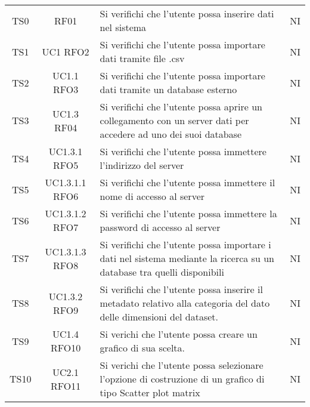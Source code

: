 \documentclass[../piano_di_qualifica.tex]{subfiles}
\begin{document}
\begin{center}
\begin{longtable}{|c|c|p{8cm}|c|}
		\endlastfoot
		TS0               & RF01                   & Si verifichi che l'utente possa inserire dati nel sistema                                                              & NI                         \\
		TS1               & UC1 RFO2               & Si verifichi che l'utente possa importare dati tramite file .csv                                                       & NI                         \\
		TS2               & UC1.1 RFO3             & Si verifichi che l'utente possa importare dati tramite un database esterno                                             & NI                         \\
		TS3               & UC1.3 RF04             & Si verifichi che l'utente possa aprire un collegamento con un server dati per accedere ad uno dei suoi database        & NI                         \\
		TS4               & UC1.3.1 RFO5           & Si verifichi che l’utente possa immettere l’indirizzo del server                                                       & NI                         \\
		TS5               & UC1.3.1.1 RFO6         & Si verifichi che l’utente possa immettere il nome di accesso al server                                                 & NI                         \\
		TS6               & UC1.3.1.2 RFO7         & Si verifichi che l’utente possa immettere la password di accesso al server                                             & NI                         \\
		TS7               & UC1.3.1.3 RFO8         & Si verifichi che l’utente possa importare i dati nel sistema mediante la ricerca su un database tra quelli disponibili & NI                         \\
		TS8               & UC1.3.2 RFO9           & Si verifichi che l’utente possa inserire il metadato relativo alla categoria del dato delle dimensioni del dataset.    & NI                         \\
		TS9               & UC1.4 RFO10            & Si verichi che l'utente possa creare un grafico di sua scelta.                                                         & NI                         \\
		TS10              & UC2.1 RFO11            & Si verichi che l'utente possa  selezionare l’opzione di costruzione di un grafico di tipo Scatter plot matrix          & NI                         \\

\end{longtable}
\end{center}
\end{document}
